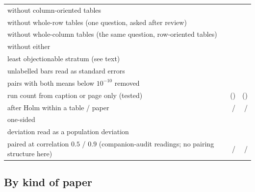 \documentclass[preprint,review,12pt]{elsarticle}
\begin{document}
\begin{table}[t]
{\begin{tabular}{@{}lrr@{}}
\quad \quad without column-oriented tables & \nCrNocolFail{} \nCrNocolFailCi{} & \nCrcNocolFail{} \nCrcNocolFailCi{} \\
\quad \quad without whole-row tables (one question, asked after review) & \nCrNowrFail{} \nCrNowrFailCi{} & \nCrcNowrFail{} \nCrcNowrFailCi{} \\
\quad \quad without whole-column tables (the same question, row-oriented tables) & \nCrNowcFail{} \nCrNowcFailCi{} & \nCrcNowcFail{} \nCrcNowcFailCi{} \\
\quad \quad without either & \nCrNolineFail{} \nCrNolineFailCi{} & \nCrcNolineFail{} \nCrcNolineFailCi{} \\
\quad \quad least objectionable stratum (see text) & \nCrLeastFail{} \nCrLeastFailCi{} & \nCrcLeastFail{} \nCrcLeastFailCi{} \\
\quad \quad unlabelled bars read as standard errors & \nCrAlUnlabelledAsSe{} & \nCrcAlUnlabelledAsSe{} \\
\quad \quad pairs with both means below $10^{-10}$ removed & \nCrPdWithoutFloorFail{} & \nCrcPdWithoutFloorFail{} \\
\quad \quad run count from caption or page only (tested) & \nCrAlCountFromCaptionOrPageFail{} (\nCrAlCountFromCaptionOrPageTested{}) & \nCrcAlCountFromCaptionOrPageFail{} (\nCrcAlCountFromCaptionOrPageTested{}) \\
\quad \quad after Holm within a table / paper & \nCrAlHolmTable{} / \nCrAlHolmPaper{} & \nCrcAlHolmTable{} / \nCrcAlHolmPaper{} \\
\quad \quad one-sided & \nCrAlOneSided{} & \nCrcAlOneSided{} \\
\quad \quad deviation read as a population deviation & \nCrAlPopulationSd{} & \nCrcAlPopulationSd{} \\
\quad \quad paired at correlation $0.5$ / $0.9$ (companion-audit readings; no pairing structure here) & \nCrAlRhoHalf{} / \nCrAlRhoNineTenths{} & \nCrcAlRhoHalf{} / \nCrcAlRhoNineTenths{} \\
\bottomrule
\end{tabular}}
\end{table}

\subsection{By kind of paper}
\label{sec:kinds}
\end{document}
